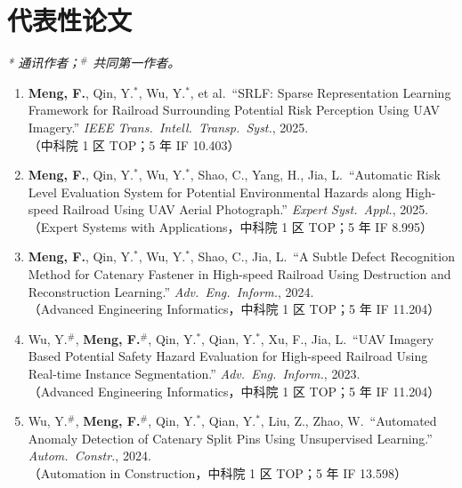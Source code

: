 \documentclass[11pt,a4paper]{ctexart}
\begin{document}
\section{代表性论文}

\noindent\textit{* 通讯作者；$^\#$ 共同第一作者。}

\begin{enumerate}[leftmargin=*,nosep,itemsep=3pt]
  \item \textbf{Meng, F.}, Qin, Y.$^*$, Wu, Y.$^*$, et al.\
    ``SRLF: Sparse Representation Learning Framework for Railroad Surrounding Potential Risk Perception Using UAV Imagery.''
    \textit{IEEE Trans.\ Intell.\ Transp.\ Syst.}, 2025.\\
    {\small\color{graytext}（中科院 1 区 TOP；5 年 IF 10.403）}

  \item \textbf{Meng, F.}, Qin, Y.$^*$, Wu, Y.$^*$, Shao, C., Yang, H., Jia, L.\
    ``Automatic Risk Level Evaluation System for Potential Environmental Hazards along High-speed Railroad Using UAV Aerial Photograph.''
    \textit{Expert Syst.\ Appl.}, 2025.\\
    {\small\color{graytext}（Expert Systems with Applications，中科院 1 区 TOP；5 年 IF 8.995）}

  \item \textbf{Meng, F.}, Qin, Y.$^*$, Wu, Y.$^*$, Shao, C., Jia, L.\
    ``A Subtle Defect Recognition Method for Catenary Fastener in High-speed Railroad Using Destruction and Reconstruction Learning.''
    \textit{Adv.\ Eng.\ Inform.}, 2024.\\
    {\small\color{graytext}（Advanced Engineering Informatics，中科院 1 区 TOP；5 年 IF 11.204）}

  \item Wu, Y.$^\#$, \textbf{Meng, F.}$^\#$, Qin, Y.$^*$, Qian, Y.$^*$, Xu, F., Jia, L.\
    ``UAV Imagery Based Potential Safety Hazard Evaluation for High-speed Railroad Using Real-time Instance Segmentation.''
    \textit{Adv.\ Eng.\ Inform.}, 2023.\\
    {\small\color{graytext}（Advanced Engineering Informatics，中科院 1 区 TOP；5 年 IF 11.204）}

  \item Wu, Y.$^\#$, \textbf{Meng, F.}$^\#$, Qin, Y.$^*$, Qian, Y.$^*$, Liu, Z., Zhao, W.\
    ``Automated Anomaly Detection of Catenary Split Pins Using Unsupervised Learning.''
    \textit{Autom.\ Constr.}, 2024.\\
    {\small\color{graytext}（Automation in Construction，中科院 1 区 TOP；5 年 IF 13.598）}


\end{enumerate}
\end{document}
